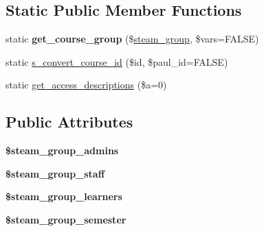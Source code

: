 \subsection*{Static Public Member Functions}
\begin{DoxyCompactItemize}
\item 
\hypertarget{classkoala__group__course_a84b90c3bcbee983e92fb9ed340aafa7d}{
static {\bfseries get\_\-course\_\-group} (\$\hyperlink{classsteam__group}{steam\_\-group}, \$vars=FALSE)}
\label{classkoala__group__course_a84b90c3bcbee983e92fb9ed340aafa7d}

\item 
static \hyperlink{classkoala__group__course_a4e3a16b7ffd0b486bb91a02bfa1b26b2}{s\_\-convert\_\-course\_\-id} (\$id, \$paul\_\-id=FALSE)
\item 
static \hyperlink{classkoala__group__course_adc5b022802dbf987a9f74f5e82a80451}{get\_\-access\_\-descriptions} (\$a=0)
\end{DoxyCompactItemize}
\subsection*{Public Attributes}
\begin{DoxyCompactItemize}
\item 
\hypertarget{classkoala__group__course_a83cbde0397b054fab3e126a2b654c24b}{
{\bfseries \$steam\_\-group\_\-admins}}
\label{classkoala__group__course_a83cbde0397b054fab3e126a2b654c24b}

\item 
\hypertarget{classkoala__group__course_aee62001244d5f2487e792d74970843f0}{
{\bfseries \$steam\_\-group\_\-staff}}
\label{classkoala__group__course_aee62001244d5f2487e792d74970843f0}

\item 
\hypertarget{classkoala__group__course_a73065c1cc35ef177b1da68b359cb66e4}{
{\bfseries \$steam\_\-group\_\-learners}}
\label{classkoala__group__course_a73065c1cc35ef177b1da68b359cb66e4}

\item 
\hypertarget{classkoala__group__course_ade80d14b70f5e4f2e2272e6ff71dee69}{
{\bfseries \$steam\_\-group\_\-semester}}
\label{classkoala__group__course_ade80d14b70f5e4f2e2272e6ff71dee69}

\end{DoxyCompactItemize}


